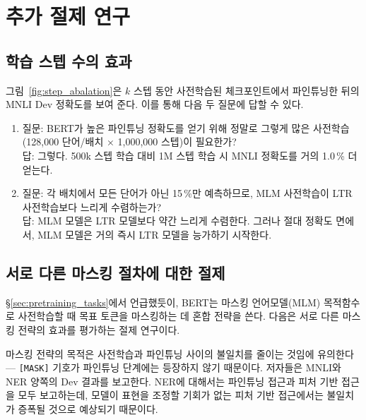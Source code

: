 
\section{추가 절제 연구}
\label{appendix:sec:more_ablation_studies}

\subsection{학습 스텝 수의 효과}
\label{sec:num_training_steps}

그림~\ref{fig:step_abalation}은 $k$ 스텝 동안 사전학습된 체크포인트에서 파인튜닝한 뒤의 MNLI Dev 정확도를 보여 준다. 이를 통해 다음 두 질문에 답할 수 있다.



\begin{enumerate}
\item 질문: BERT가 높은 파인튜닝 정확도를 얻기 위해 정말로 그렇게 많은 사전학습(128,000 단어/배치 × 1,000,000 스텝)이 필요한가? \\
답: 그렇다.  500k 스텝 학습 대비 1M 스텝 학습 시 MNLI 정확도를 거의 1.0\,\% 더 얻는다.
\item 질문: 각 배치에서 모든 단어가 아닌 15\,\%만 예측하므로, MLM 사전학습이 LTR 사전학습보다 느리게 수렴하는가? \\
답: MLM 모델은 LTR 모델보다 약간 느리게 수렴한다. 그러나 절대 정확도 면에서, MLM 모델은 거의 즉시 LTR 모델을 능가하기 시작한다.
\end{enumerate}

\subsection{서로 다른 마스킹 절차에 대한 절제}
\label{appendix:sec:different_masks}

\S\ref{sec:pretraining_tasks}에서 언급했듯이, BERT는 마스킹 언어모델(MLM) 목적함수로 사전학습할 때 목표 토큰을 마스킹하는 데 혼합 전략을 쓴다. 다음은 서로 다른 마스킹 전략의 효과를 평가하는 절제 연구이다.

마스킹 전략의 목적은 사전학습과 파인튜닝 사이의 불일치를 줄이는 것임에 유의한다 — {\tt [MASK]} 기호가 파인튜닝 단계에는 등장하지 않기 때문이다. 저자들은 MNLI와 NER 양쪽의 Dev 결과를 보고한다. NER에 대해서는 파인튜닝 접근과 피처 기반 접근을 모두 보고하는데, 모델이 표현을 조정할 기회가 없는 피처 기반 접근에서는 불일치가 증폭될 것으로 예상되기 때문이다.



